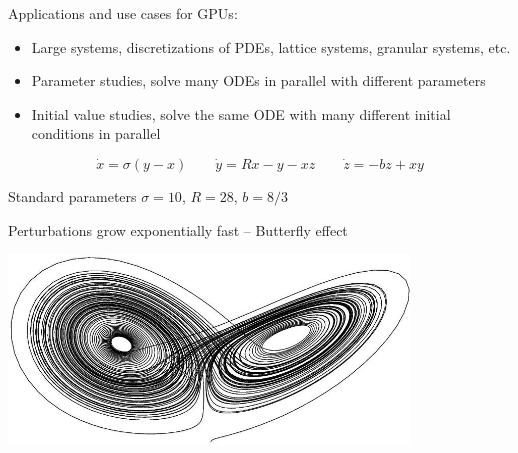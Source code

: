 \begin{frame}[fragile]
 

\vspace{2ex}
Applications and use cases for GPUs:

\begin{itemize}
 \item Large systems, discretizations of PDEs, lattice systems, granular systems, etc.
 \item Parameter studies, solve many ODEs in parallel with different parameters
 \item Initial value studies, solve the same ODE with many different initial conditions in parallel
\end{itemize}


\end{frame}



\begin{frame}[fragile]
 

 $$
  \dot{x} = \sigma ( y - x ) \quad \quad \dot{y} = R x - y - x z \quad \quad \dot{z} = -b z + x y
 $$

Standard parameters $\sigma=10$, $R=28$, $b=8/3$

\vspace{2ex}
Perturbations grow exponentially fast -- Butterfly effect

\vspace{4ex}

\centerline{\includegraphics[draft=false,width=0.8\textwidth]{lorenz.jpg}}



\end{frame}


